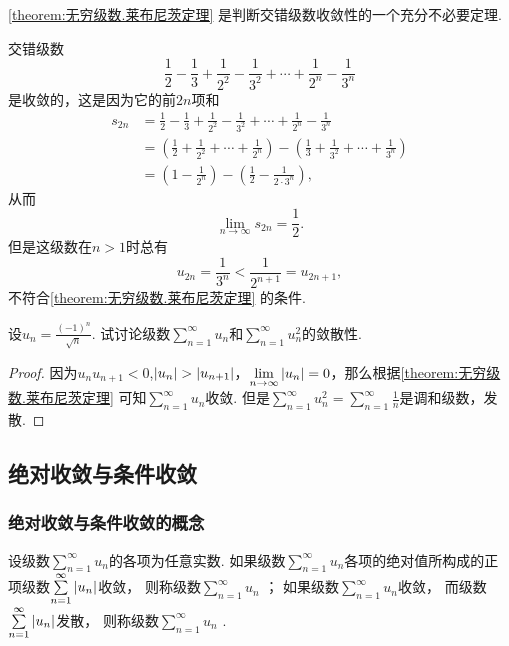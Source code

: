 \cref{theorem:无穷级数.莱布尼茨定理} 是判断交错级数收敛性的一个充分不必要定理.
\begin{example}
交错级数\[
\frac{1}{2} - \frac{1}{3}
+ \frac{1}{2^2} - \frac{1}{3^2}
+ \dotsm + \frac{1}{2^n} - \frac{1}{3^n}
\]是收敛的，这是因为它的前\(2n\)项和\begin{align*}
s_{2n} &= \frac{1}{2} - \frac{1}{3}
+ \frac{1}{2^2} - \frac{1}{3^2}
+ \dotsm + \frac{1}{2^n} - \frac{1}{3^n} \\
&= \left(\frac{1}{2} + \frac{1}{2^2} + \dotsm + \frac{1}{2^n}\right)
 - \left(\frac{1}{3} + \frac{1}{3^2} + \dotsm + \frac{1}{3^n}\right) \\
&= \left(1 - \frac{1}{2^n}\right)
 - \left(\frac{1}{2} - \frac{1}{2\cdot3^n}\right),
\end{align*}从而\[
\lim\limits_{n\to\infty} s_{2n} = \frac{1}{2}.
\]但是这级数在\(n>1\)时总有\[
u_{2n} = \frac{1}{3^n} < \frac{1}{2^{n+1}} = u_{2n+1},
\]不符合\cref{theorem:无穷级数.莱布尼茨定理} 的条件.
\end{example}

\begin{example}
设\(u_n = \frac{(-1)^n}{\sqrt{n}}\).
试讨论级数\(\sum\limits_{n=1}^\infty u_n\)和\(\sum\limits_{n=1}^\infty u_n^2\)的敛散性.
\begin{proof}
因为\(u_n u_{n+1} < 0\),\(\abs{u_n} > \abs{u_{n+1}}\)，\(\lim\limits_{n\to\infty} \abs{u_n} = 0\)，那么根据\cref{theorem:无穷级数.莱布尼茨定理} 可知\(\sum\limits_{n=1}^\infty u_n\)收敛.
但是\(\sum\limits_{n=1}^\infty u_n^2 = \sum\limits_{n=1}^\infty \frac{1}{n}\)是调和级数，发散.
\end{proof}
\end{example}

\subsection{绝对收敛与条件收敛}
\subsubsection{绝对收敛与条件收敛的概念}
\begin{definition}
设级数\(\sum\limits_{n=1}^\infty u_n\)的各项为任意实数.
如果级数\(\sum\limits_{n=1}^\infty u_n\)各项的绝对值所构成的正项级数\(\sum\limits_{n=1}^\infty \abs{u_n}\)收敛，
则称级数\(\sum\limits_{n=1}^\infty u_n\) ；
如果级数\(\sum\limits_{n=1}^\infty u_n\)收敛，
而级数\(\sum\limits_{n=1}^\infty \abs{u_n}\)发散，
则称级数\(\sum\limits_{n=1}^\infty u_n\) .
\end{definition}

